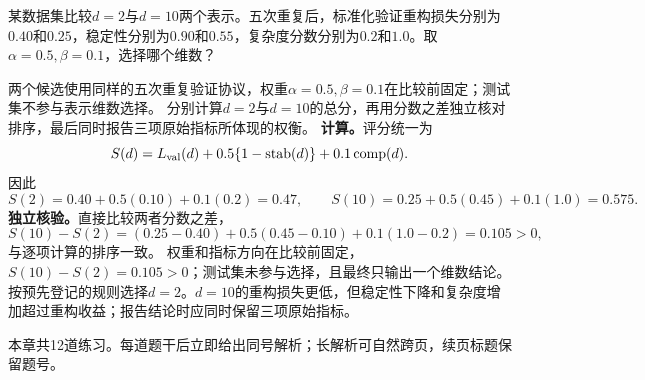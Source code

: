 \label{struct:V4-C01-CH18}
\label{struct:V4-C01-CH32}
\begin{example}[两个候选表示维数的选择]\label{exm:V4-C01-model-choice}
某数据集比较$d=2$与$d=10$两个表示。五次重复后，标准化验证重构损失分别为$0.40$和$0.25$，稳定性分别为$0.90$和$0.55$，复杂度分数分别为$0.2$和$1.0$。取$\alpha=0.5,\beta=0.1$，选择哪个维数？

\label{struct:V4-C01-CH33}
\end{example}
\begin{solution}
\SolGiven 两个候选使用同样的五次重复验证协议，权重$\alpha=0.5,\beta=0.1$在比较前固定；测试集不参与表示维数选择。
\SolPlan 分别计算$d=2$与$d=10$的总分，再用分数之差独立核对排序，最后同时报告三项原始指标所体现的权衡。
\SolDerive
\textbf{计算。}评分统一为
\[
S(d)=L_{\rm val}(d)+0.5\{1-\operatorname{stab}(d)\}+0.1\operatorname{comp}(d).
\]
因此
\[
S(2)=0.40+0.5(0.10)+0.1(0.2)=0.47,
\qquad
S(10)=0.25+0.5(0.45)+0.1(1.0)=0.575.
\]
\textbf{独立核验。}直接比较两者分数之差，
\[
S(10)-S(2)=(0.25-0.40)+0.5(0.45-0.10)+0.1(1.0-0.2)
=0.105>0,
\]
与逐项计算的排序一致。
\SolCheck 权重和指标方向在比较前固定，$S(10)-S(2)=0.105>0$；测试集未参与选择，且最终只输出一个维数结论。
\SolAnswer 按预先登记的规则选择$d=2$。$d=10$的重构损失更低，但稳定性下降和复杂度增加超过重构收益；报告结论时应同时保留三项原始指标。
\end{solution}

\label{struct:V4-C01-CH34}
\begin{chapterexercisebox}
\label{struct:V4-C01-CH35}
本章共12道练习。每道题干后立即给出同号解析；长解析可自然跨页，续页标题保留题号。
\end{chapterexercisebox}

